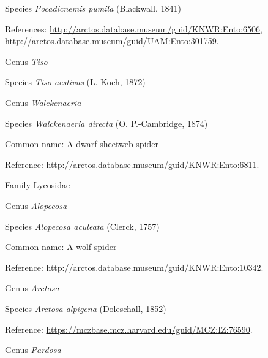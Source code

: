 \documentclass[9pt, article]{memoir}
\begin{document}
\begin{multicols}{2}
\vspace{6pt}\noindent\hspace{36pt}Species \textit{Pocadicnemis pumila} (Blackwall, 1841)


References: 
\url{http://arctos.database.museum/guid/KNWR:Ento:6506}, 
\url{http://arctos.database.museum/guid/UAM:Ento:301759}.

\vspace{6pt}\noindent\hspace{30pt}Genus \textit{Tiso}


\vspace{6pt}\noindent\hspace{36pt}Species \textit{Tiso aestivus} (L. Koch, 1872)


\vspace{6pt}\noindent\hspace{30pt}Genus \textit{Walckenaeria}


\vspace{6pt}\noindent\hspace{36pt}Species \textit{Walckenaeria directa} (O. P.-Cambridge, 1874)


Common name: A dwarf sheetweb spider

Reference: 
\url{http://arctos.database.museum/guid/KNWR:Ento:6811}.

\vspace{6pt}\noindent\hspace{24pt}Family Lycosidae


\vspace{6pt}\noindent\hspace{30pt}Genus \textit{Alopecosa}


\vspace{6pt}\noindent\hspace{36pt}Species \textit{Alopecosa aculeata} (Clerck, 1757)


Common name: A wolf spider

Reference: 
\url{http://arctos.database.museum/guid/KNWR:Ento:10342}.

\vspace{6pt}\noindent\hspace{30pt}Genus \textit{Arctosa}


\vspace{6pt}\noindent\hspace{36pt}Species \textit{Arctosa alpigena} (Doleschall, 1852)


Reference: 
\url{https://mczbase.mcz.harvard.edu/guid/MCZ:IZ:76590}.

\vspace{6pt}\noindent\hspace{30pt}Genus \textit{Pardosa}



\end{multicols}
\end{document}
